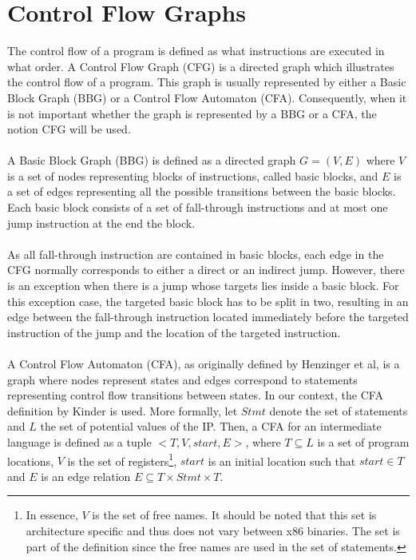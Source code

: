 \documentclass{kththesis}
\newcommand{\fbcomment}[1]{{#1}}
\renewcommand{\fbcomment}[1]{}
\begin{document}
\section{Control Flow Graphs}
\fbcomment{\color{red}Goal: Introduce the concept of CFG, BBG and CFA as well as describing the difference between them. Additionally, explain when a generalised CFA is not equivalent to the common CFA.}
The control flow of a program is defined as what instructions are executed in what order. A Control Flow Graph (CFG) is a directed graph which illustrates the control flow of a program. This graph is usually represented by either a Basic Block Graph (BBG) or a Control Flow Automaton (CFA). Consequently, when it is not important whether the graph is represented by a BBG or a CFA, the notion CFG will be used. 
\\ \\
A Basic Block Graph (BBG) is defined as a directed graph $G = (V,E)$ where $V$ is a set of nodes representing blocks of instructions, called basic blocks, and $E$ is a set of edges representing all the possible transitions between the basic blocks. Each basic block consists of a set of fall-through instructions and at most one jump instruction at the end the block. 
\\ \\
As all fall-through instruction are contained in basic blocks, each edge in the CFG normally corresponds to either a direct or an indirect jump. However, there is an exception when there is a jump whose targets lies inside a basic block. For this exception case, the targeted basic block has to be split in two, resulting in an edge between the fall-through instruction located immediately before the targeted instruction of the jump and the location of the targeted instruction. 
\\ \\ 
A Control Flow Automaton (CFA), as originally defined by Henzinger et al\cite{lazyAbstraction}, is a graph where nodes represent states and edges correspond to statements representing control flow transitions between states. In our context, the CFA definition by Kinder\cite{Jakstab} is used. More formally, let $Stmt$ denote the set of statements and $L$ the set of potential values of the IP. Then, a CFA for an intermediate language is defined as a tuple $<T,V,start,E>$, where $T \subseteq L$ is a set of program locations, $V$ is the set of registers\footnote{In essence, $V$ is the set of free names. It should be noted that this set is architecture specific and thus does not vary between x86 binaries. The set is part of the definition since the free names are used in the set of statements.}, $start$ is an initial location such that $start \in T$ and $E$ is an edge relation $E \subseteq T \times Stmt \times T$. 
\end{document}
